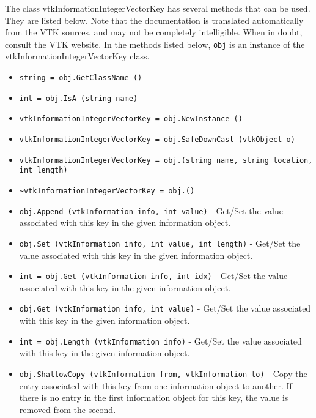 The class vtkInformationIntegerVectorKey has several methods that can be used.
  They are listed below.
Note that the documentation is translated automatically from the VTK sources,
and may not be completely intelligible.  When in doubt, consult the VTK website.
In the methods listed below, \verb|obj| is an instance of the vtkInformationIntegerVectorKey class.
\begin{itemize}
\item  \verb|string = obj.GetClassName ()|

\item  \verb|int = obj.IsA (string name)|

\item  \verb|vtkInformationIntegerVectorKey = obj.NewInstance ()|

\item  \verb|vtkInformationIntegerVectorKey = obj.SafeDownCast (vtkObject o)|

\item  \verb|vtkInformationIntegerVectorKey = obj.(string name, string location, int length)|

\item  \verb|~vtkInformationIntegerVectorKey = obj.()|

\item  \verb|obj.Append (vtkInformation info, int value)| -  Get/Set the value associated with this key in the given
 information object.

\item  \verb|obj.Set (vtkInformation info, int value, int length)| -  Get/Set the value associated with this key in the given
 information object.

\item  \verb|int = obj.Get (vtkInformation info, int idx)| -  Get/Set the value associated with this key in the given
 information object.

\item  \verb|obj.Get (vtkInformation info, int value)| -  Get/Set the value associated with this key in the given
 information object.

\item  \verb|int = obj.Length (vtkInformation info)| -  Get/Set the value associated with this key in the given
 information object.

\item  \verb|obj.ShallowCopy (vtkInformation from, vtkInformation to)| -  Copy the entry associated with this key from one information
 object to another.  If there is no entry in the first information
 object for this key, the value is removed from the second.

\end{itemize}
